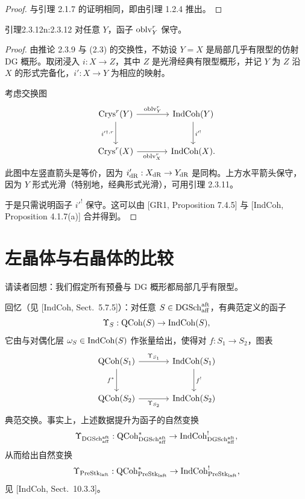 \begin{proof}
与引理 2.1.7 的证明相同，即由引理 1.2.4 推出。
\end{proof}

\begin{othm}{引理}{2.3.12}{n:2.3.12}
对任意 $Y$，函子 $\mathrm{oblv}^r_Y$ 保守。
\end{othm}

\begin{proof}
由推论 2.3.9 与 (2.3) 的交换性，不妨设 $Y=X$ 是局部几乎有限型的仿射 DG 概形。取闭浸入 $i:X\to Z$，其中 $Z$ 是光滑经典有限型概形，并记 $Y$ 为 $Z$ 沿 $X$ 的形式完备化，$i':X\to Y$ 为相应的映射。

考虑交换图
\[
\begin{tikzcd}[column sep=large, row sep=large]
 \Crys^r(Y) \arrow[r, "\oblv^r_Y"] \arrow[d, "i'^{\dagger,r}"'] & \IndCoh(Y) \arrow[d, "i'^!"] \\
 \Crys^r(X) \arrow[r, "\oblv^r_X"'] & \IndCoh(X).
\end{tikzcd}
\]
此图中左竖直箭头是等价，因为 $i'_{\mathrm{dR}}:X_{\mathrm{dR}}\to Y_{\mathrm{dR}}$ 是同构。上方水平箭头保守，因为 $Y$ 形式光滑（特别地，经典形式光滑），可用引理 2.3.11。

于是只需说明函子 $i'^!$ 保守。这可以由 [GR1, Proposition 7.4.5] 与 [IndCoh, Proposition 4.1.7(a)] 合并得到。
\end{proof}

\section{左晶体与右晶体的比较}

请读者回想：我们假定所有预叠与 DG 概形都局部几乎有限型。

回忆（见 [IndCoh, Sect.~5.7.5]）：对任意 $S\in\mathrm{DGSch}_{\mathrm{aff}}^{\mathrm{aft}}$，有典范定义的函子
\[
\Upsilon_S:\mathrm{QCoh}(S)\to\mathrm{IndCoh}(S),
\]
它由与对偶化层 $\omega_S\in\mathrm{IndCoh}(S)$ 作张量给出，使得对 $f:S_1\to S_2$，图表
\[
\begin{tikzcd}[column sep=large, row sep=large]
 \QCoh(S_1) \arrow[r, "\Upsilon_{S_1}"] \arrow[d, "f^*"'] & \IndCoh(S_1) \arrow[d, "f^!"] \\
 \QCoh(S_2) \arrow[r, "\Upsilon_{S_2}"'] & \IndCoh(S_2)
\end{tikzcd}
\]
典范交换。事实上，上述数据提升为函子的自然变换
\[
\Upsilon_{\mathrm{DGSch}_{\mathrm{aff}}^{\mathrm{aft}}}:\mathrm{QCoh}^*_{\mathrm{DGSch}_{\mathrm{aff}}^{\mathrm{aft}}}\to\mathrm{IndCoh}^!_{\mathrm{DGSch}_{\mathrm{aff}}^{\mathrm{aft}}},
\]
从而给出自然变换
\[
\Upsilon_{\mathrm{PreStk}_{\mathrm{laft}}}:\mathrm{QCoh}^*_{\mathrm{PreStk}_{\mathrm{laft}}}\to\mathrm{IndCoh}^!_{\mathrm{PreStk}_{\mathrm{laft}}},
\]
见 [IndCoh, Sect.~10.3.3]。

